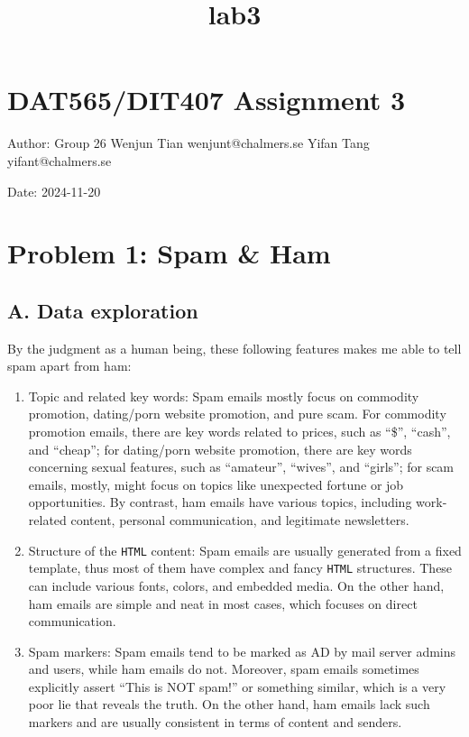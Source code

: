 \documentclass[11pt]{article}
\title{lab3}
\begin{document}
    
    \maketitle
    
    

    
    \hypertarget{dat565dit407-assignment-3}{%
\section{DAT565/DIT407 Assignment 3}\label{dat565dit407-assignment-3}}

Author: Group 26 \textbar{} Wenjun Tian wenjunt@chalmers.se \textbar{}
Yifan Tang yifant@chalmers.se

Date: 2024-11-20

    \hypertarget{problem-1-spam-ham}{%
\section{Problem 1: Spam \& Ham}\label{problem-1-spam-ham}}

\hypertarget{a.-data-exploration}{%
\subsection{A. Data exploration}\label{a.-data-exploration}}

By the judgment as a human being, these following features makes me able
to tell spam apart from ham:

\begin{enumerate}
\def\labelenumi{\arabic{enumi}.}
\item
  Topic and related key words: Spam emails mostly focus on commodity
  promotion, dating/porn website promotion, and pure scam. For commodity
  promotion emails, there are key words related to prices, such as
  ``\$'', ``cash'', and ``cheap''; for dating/porn website promotion,
  there are key words concerning sexual features, such as ``amateur'',
  ``wives'', and ``girls''; for scam emails, mostly, might focus on
  topics like unexpected fortune or job opportunities. By contrast, ham
  emails have various topics, including work-related content, personal
  communication, and legitimate newsletters.
\item
  Structure of the \texttt{HTML} content: Spam emails are usually
  generated from a fixed template, thus most of them have complex and
  fancy \texttt{HTML} structures. These can include various fonts,
  colors, and embedded media. On the other hand, ham emails are simple
  and neat in most cases, which focuses on direct communication.
\item
  Spam markers: Spam emails tend to be marked as AD by mail server
  admins and users, while ham emails do not. Moreover, spam emails
  sometimes explicitly assert ``This is NOT spam!'' or something
  similar, which is a very poor lie that reveals the truth. On the other
  hand, ham emails lack such markers and are usually consistent in terms
  of content and senders.
\end{enumerate}
\end{document}
